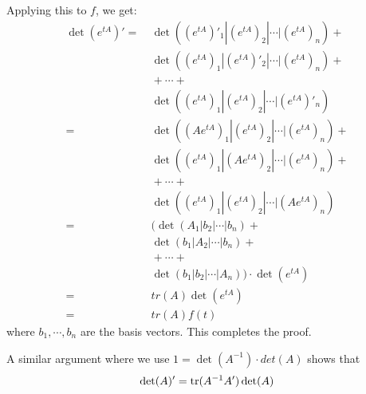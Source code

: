 Applying this to $f$, we get:
\begin{align*}
  \det(e^{tA})' = &\ \det((e^{tA})'_1 | (e^{tA})_2 | \cdots | (e^{tA})_n)
                + \\&\ \det((e^{tA})_1 | (e^{tA})'_2 | \cdots | (e^{tA})_n)
                + \\&\ +\cdots
                + \\&\ \det((e^{tA})_1 | (e^{tA})_2 | \cdots | (e^{tA})'_n)\\
                = &\ \det((Ae^{tA})_1 | (e^{tA})_2 | \cdots | (e^{tA})_n)
                + \\&\ \det((e^{tA})_1 | (Ae^{tA})_2 | \cdots | (e^{tA})_n)
                + \\&\ +\cdots
                + \\&\ \det((e^{tA})_1 | (e^{tA})_2 | \cdots | (Ae^{tA})_n)\\
                = &\ (\det(A_1 | b_2 | \cdots | b_n)
                + \\&\ \det(b_1 | A_2 | \cdots | b_n)
                + \\&\ +\cdots
                + \\&\ \det(b_1 | b_2 | \cdots | A_n))\cdot \det(e^{tA})\\
                = &\ tr(A)\det(e^{tA})\\
                = &\ tr(A)f(t)
\end{align*}
where $b_1,\cdots,b_n$ are the basis vectors.
This completes the proof.

A similar argument where we use $1 = \det(A^{-1})\cdot det(A)$ shows that
\begin{align*}
  \det(A)' = \operatorname*{tr}(A^{-1}A')\det(A)
\end{align*}



